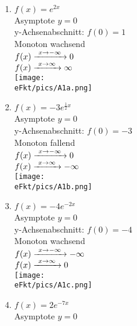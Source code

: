 \newpage
\begin{Answer}[ref=eFktA1]\\
	\begin{minipage}{\textwidth}
		\begin{minipage}[t]{0.49\textwidth}
			\begin{enumerate}[label=\alph*)]
				\item \(f(x)=e^{2x}\)\\
				Asymptote \(y=0\)\\
				y-Achsenabschnitt: \(f(0)=1\)\\
				Monoton wachsend\\
				\(f(x)\xrightarrow{\hphantom{\ }x\to-\infty\hphantom{\ }}0\)\\
				\(f(x)\xrightarrow{\hphantom{\ }x\to\infty\hphantom{\ }}\infty\)\\
				\texttt{[image: \\eFkt/pics/A1a.png]}
				\item \(f(x)=-3e^{\frac{1}{2}x}\)\\
				Asymptote \(y=0\)\\
				y-Achsenabschnitt: \(f(0)=-3\)\\
				Monoton fallend\\
				\(f(x)\xrightarrow{\hphantom{\ }x\to-\infty\hphantom{\ }}0\)\\
				\(f(x)\xrightarrow{\hphantom{\ }x\to\infty\hphantom{\ }}-\infty\)\\
				\texttt{[image: \\eFkt/pics/A1b.png]}
				\item \(f(x)=-4e^{-2x}\)\\
				Asymptote \(y=0\)\\
				y-Achsenabschnitt: \(f(0)=-4\)\\
				Monoton wachsend\\
				\(f(x)\xrightarrow{\hphantom{\ }x\to-\infty\hphantom{\ }}-\infty\)\\
				\(f(x)\xrightarrow{\hphantom{\ }x\to\infty\hphantom{\ }}0\)\\
				\texttt{[image: \\eFkt/pics/A1c.png]}
			\end{enumerate}
		\end{minipage}
		\begin{minipage}[t]{0.49\textwidth}
			\begin{enumerate}[label=\alph*)]
				\setcounter{enumi}{3}
				\item \(f(x)=2e^{-7x}\)\\
				Asymptote \(y=0\)\\

\end{enumerate}
\end{minipage}
\end{minipage}
\end{Answer}
